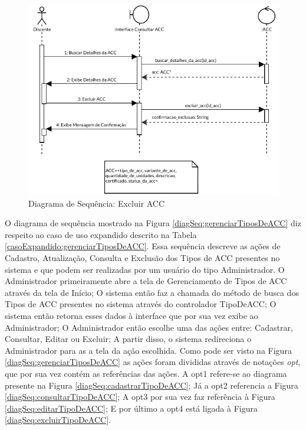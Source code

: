 \begin{figure}[H]
    \centering 
    \includegraphics[width=\textwidth]{dados/figuras/Proposta/DiagramasDeSequencia/Gerenciar ACCs_ Completo-Excluir ACC.pdf}
    \caption{Diagrama de Sequência: Excluir ACC}
    \label{diagSeq:excluirACC}
\end{figure}


O diagrama de sequência mostrado na Figura \ref{diagSeq:gerenciarTiposDeACC} diz respeito ao caso de uso expandido descrito na Tabela \ref{casoExpandido:gerenciarTiposDeACC}. Essa sequência descreve as ações de Cadastro, Atualização, Consulta e Exclusão dos Tipos de ACC presentes no sistema e que podem ser realizadas por um usuário do tipo Administrador. O Administrador primeiramente abre a tela de Gerenciamento de Tipos de ACC através da tela de Início; O sistema então faz a chamada do método de busca dos Tipos de ACC presentes no sistema através do controlador TipoDeACC; O sistema então retorna esses dados à interface que por sua vez exibe ao Administrador; O Administrador então escolhe uma das ações entre: Cadastrar, Consultar, Editar ou Excluir; A partir disso, o sistema redireciona o Administrador para as a tela da ação escolhida. Como pode ser visto na Figura \ref{diagSeq:gerenciarTiposDeACC} as ações foram divididas através de notações \textit{opt}, que por sua vez contém as referências das ações. A opt1 refere-se ao diagrama presente na Figura \ref{diagSeq:cadastrarTipoDeACC}; Já a opt2 referencia a Figura \ref{diagSeq:consultarTipoDeACC}; A opt3 por sua vez faz referência à Figura \ref{diagSeq:editarTipoDeACC}; E por último a opt4 está ligada à Figura \ref{diagSeq:excluirTipoDeACC}.

